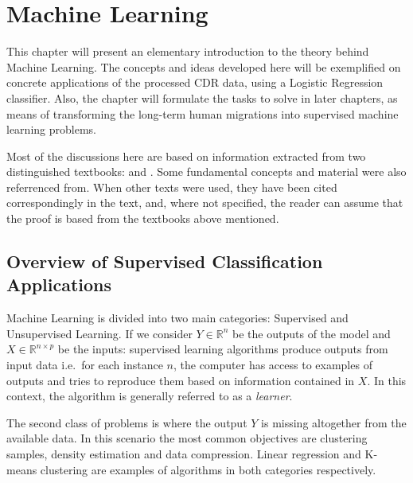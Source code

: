 

\chapter{Machine Learning}\label{ch:machineLearning}

This chapter will present an elementary introduction to the theory behind Machine Learning.
The concepts and ideas developed here will be exemplified on concrete applications of the processed CDR data, using a Logistic Regression classifier.
Also, the chapter will formulate the tasks to solve in later chapters, as means of transforming the long-term human migrations into supervised machine learning problems.

Most of the discussions here are based on information extracted from two distinguished textbooks: \textcite{bishop-patternRecognition} and \textcite{hastie-elemstatslearn}.
Some fundamental concepts and material were also referrenced from\cite{scikit-learn}.
When other texts were used, they have been cited correspondingly in the text, and, where not specified, the reader can assume that the proof is based from the textbooks above mentioned.

\section{Overview of Supervised Classification Applications}\label{section-supervised-learning}


Machine Learning is divided into two main categories: Supervised and Unsupervised Learning.
If we consider $Y \in \mathbb{R}^n$ be the outputs of the model and $X \in \mathbb{R}^{n \times p}$ be the inputs: supervised learning algorithms produce outputs from input data i.e.\ for each instance $n$, the computer has access to examples of outputs and tries to reproduce them based on information contained in $X$.
In this context, the algorithm is generally referred to as a \textit{learner}.

The second class of problems is where the output $Y$ is missing altogether from the available data.
In this scenario the most common objectives are clustering samples, density estimation and data compression.
Linear regression and K-means clustering are examples of algorithms in both categories respectively.

